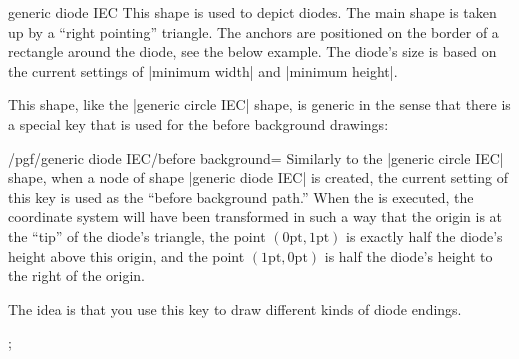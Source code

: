 \begin{shape}{generic diode IEC}
  This shape is used to depict diodes. The main shape is taken up by a
  ``right pointing'' triangle. The anchors are positioned on the border of
  a rectangle around the diode, see the below example.  The
  diode's size is based on the current settings of |minimum width| and
  |minimum height|.
\begin{codeexample}[]
\end{codeexample}

  This shape, like the |generic circle IEC| shape, is generic in the
  sense that there is a special key that is used for the before
  background drawings:
  \begin{key}{/pgf/generic diode IEC/before background=}
    Similarly to the |generic circle IEC| shape, when a node of shape
    |generic diode IEC| is created, the current setting of this key is
    used as the ``before background path.''
    When the  is executed, the coordinate system will have
    been transformed in such a way that the origin is at the ``tip''
    of the diode's triangle, the point $(0\mathrm{pt},1\mathrm{pt})$
    is exactly half the diode's height above this origin, and
    the point $(1\mathrm{pt},0\mathrm{pt})$ is half the diode's height
    to the right of the origin.

    The idea is that you use this key to draw different kinds of diode
    endings.
\begin{codeexample}[]
\tikz \node [minimum size=1cm,generic diode IEC,
             /pgf/generic diode IEC/before background={
               \pgfpathmoveto{\pgfqpoint{-.5pt}{-1pt}}
               \pgfpathlineto{\pgfqpoint{.5pt}{-1pt}}
               \pgfpathmoveto{\pgfqpoint{0pt}{-1pt}}
               \pgfpathlineto{\pgfqpoint{0pt}{1pt}}
               \pgfpathmoveto{\pgfqpoint{-.5pt}{1pt}}
               \pgfpathlineto{\pgfqpoint{.5pt}{1pt}}
               \pgfusepathqstroke
             },
             draw] {};
\end{codeexample}
  \end{key}
\end{shape}




